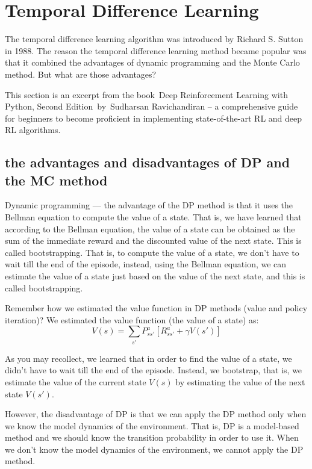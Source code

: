 ﻿

\section{Temporal Difference Learning}

\cite{ODSC2020}

The temporal difference learning algorithm was introduced by Richard S. 
Sutton in 1988.  The reason the temporal difference learning method became 
popular was that it combined the advantages of dynamic programming and the 
Monte Carlo method. But what are those advantages? 

This section is an excerpt from the book  Deep Reinforcement Learning with 
Python, Second Edition  by  Sudharsan Ravichandiran – a comprehensive guide 
for beginners to become proficient in implementing state-of-the-art RL and 
deep RL algorithms.  

\subsection{the advantages and disadvantages of DP and the MC method}

Dynamic programming — the advantage of the DP method is that it uses the 
Bellman equation to compute the value of a state. That is, we have learned 
that according to the Bellman equation, the value of a state can be obtained 
as the sum of the immediate reward and the discounted value of the next 
state. This is called bootstrapping. That is, to compute the value of a 
state, we don't have to wait till the end of the episode, instead, using 
the Bellman equation, we can estimate the value of a state just based on 
the value of the next state, and this is called bootstrapping.  

Remember how we estimated the value function in DP methods (value and policy 
iteration)? We estimated the value function (the value of a state) as:
$$
V(s) = \sum_{s'}P_{ss'}^a\left[ R_{ss'}^a + \gamma V(s') \right]
$$

As you may recollect, we learned that in order to find the value of a state, 
we didn't have to wait till the end of the episode. Instead, we bootstrap, 
that is, we estimate the value of the current state $V(s)$ by estimating the 
value of the next state $V(s')$. 

However, the disadvantage of DP is that we can apply the DP method only when 
we know the model dynamics of the environment. That is, DP is a model-based 
method and we should know the transition probability in order to use it. 
When we don't know the model dynamics of the environment, we cannot apply 
the DP method.  

